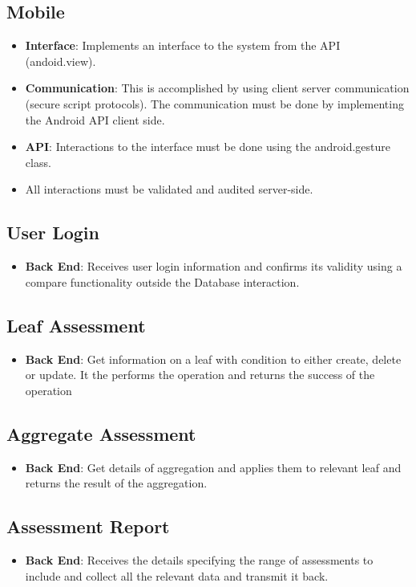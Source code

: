 \documentclass[a4paper]{article}
\begin{document}
\subsection*{Mobile}
\begin{itemize}
\item \textbf{Interface}: Implements an interface to the system from the API (andoid.view). 
\item \textbf{Communication}: This is accomplished by using client server communication (secure script protocols).  The communication must be done by implementing the Android API client side.
\item \textbf{API}:  Interactions to the interface must be done using the android.gesture class.
\item All interactions must be validated and audited server-side.
\end{itemize}

\subsection*{User Login}
\begin{itemize}
\item \textbf{Back End}: Receives user login information and confirms its validity using a compare functionality outside the Database interaction.
\end{itemize}

\subsection*{Leaf Assessment}
\begin{itemize}
\item \textbf{Back End}: Get information on a leaf with condition to either create, delete or update. It the performs the operation and returns the success of the operation
\end{itemize}

\subsection*{Aggregate Assessment}
\begin{itemize}
\item \textbf{Back End}: Get details of aggregation and applies them to relevant leaf and returns the result of the aggregation.
\end{itemize}

\subsection*{Assessment Report}
\begin{itemize}
\item \textbf{Back End}: Receives the details specifying the range of assessments to include and collect all the relevant data and transmit it back.
\end{itemize}
\end{document}
